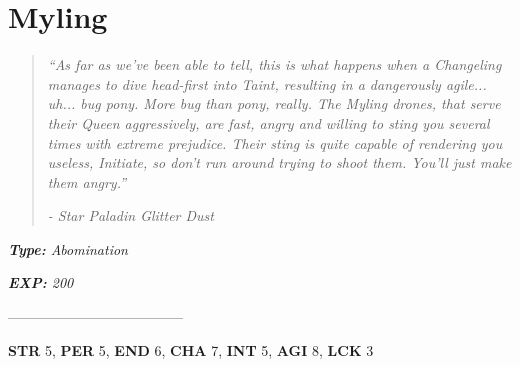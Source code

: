 \documentclass[11pt,a4paper,twocolumn]{book}
\begin{document}
	\section*{Myling}
	\begin{quote}
		\emph{``As far as we've been able to tell, this is what happens when a Changeling manages to dive head-first into Taint, resulting in a dangerously agile... uh... bug pony. More bug than pony, really. The Myling drones, that serve their Queen aggressively, are fast, angry and willing to sting you several times with extreme prejudice. Their sting is quite capable of rendering you useless, Initiate, so don't run around trying to shoot them. You'll just make them angry.''}
		
		\emph{-	Star Paladin Glitter Dust}
	\end{quote}
	
	\noindent
	\emph{\textbf{Type:} Abomination}
	
	\noindent
	\emph{\textbf{EXP:} 200}
	
%		
%	
%		

--------------------------------------

\noindent
\textbf{STR} 5, \textbf{PER} 5, \textbf{END} 6, \textbf{CHA} 7, \textbf{INT} 5, \textbf{AGI} 8, \textbf{LCK} 3
\end{document}
